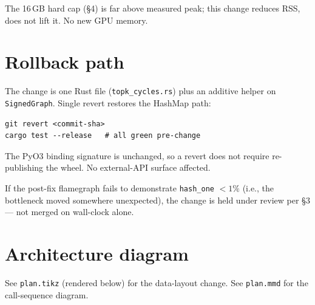 \documentclass[a4paper,11pt]{article}
\begin{document}
The 16\,GB hard cap (\S4) is far above measured peak; this change
reduces RSS, does not lift it. No new GPU memory.

\section*{Rollback path}

The change is one Rust file (\texttt{topk\_cycles.rs}) plus an additive
helper on \texttt{SignedGraph}. Single revert restores the HashMap path:

\begin{lstlisting}
git revert <commit-sha>
cargo test --release   # all green pre-change
\end{lstlisting}

The PyO3 binding signature is unchanged, so a revert does not require
re-publishing the wheel. No external-API surface affected.

If the post-fix flamegraph fails to demonstrate \texttt{hash\_one}
$< 1\%$ (i.e., the bottleneck moved somewhere unexpected), the change
is held under review per \S3 — not merged on wall-clock alone.

\section*{Architecture diagram}

See \texttt{plan.tikz} (rendered below) for the data-layout change.
See \texttt{plan.mmd} for the call-sequence diagram.

\begin{center}

\end{center}
\end{document}
